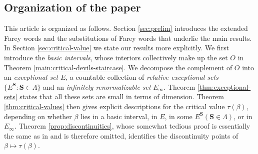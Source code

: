\documentclass[12pt]{amsart}
\theoremstyle{definition}
\theoremstyle{remark}
\numberwithin{equation}{section}
\newcommand{\cs}{ {\mathbf{S}}}
\newcommand{\f}{\infty}
\newcommand{\La}{\Lambda}
\begin{document}
\bigskip

\subsection{Organization of the paper}
This article is organized as follows. Section \ref{sec:prelim} introduces the extended Farey words and the substitutions of Farey words that underlie the main results. In Section \ref{sec:critical-value} we state our results more explicitly. We first introduce the {\em basic intervals}, whose interiors collectively make up the set $O$ in Theorem \ref{main:critical-devils-staircase}. We decompose the complement of $O$ into an {\em exceptional set} $E$, a countable collection of {\em relative exceptional sets} $\{E^\cs: \cs\in\La\}$ and an {\em infinitely renormalizable set} $E_\f$. Theorem \ref{thm:exceptional-sets} states that all these sets are small in terms of dimension. Theorem \ref{thm:critical-values} then gives explicit descriptions for the critical value $\tau(\beta)$, depending on whether $\beta$ lies in a basic interval, in $E$, in some $E^\cs (\cs\in\La)$, or in $E_\f$. Theorem \ref{prop:discontinuities}, whose somewhat tedious proof is essentially the same as in \cite{Allaart-Kong-2021} and is therefore omitted, identifies the discontinuity points of $\beta\mapsto \tau(\beta)$.  
\end{document}
